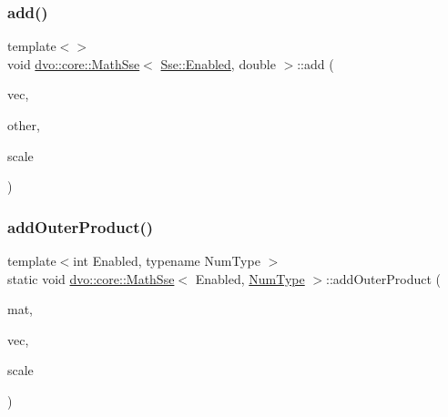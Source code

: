 \mbox{\label{classdvo_1_1core_1_1_math_sse_a569d441b55c932cf1220a93ef5f155f3}} 
\subsubsection{\texorpdfstring{add()}{add()}\hspace{0.1cm}{\footnotesize\ttfamily [5/5]}}
{\footnotesize\ttfamily template$<$$>$ \\
void \mbox{\hyperlink{classdvo_1_1core_1_1_math_sse}{dvo\+::core\+::\+Math\+Sse}}$<$ \mbox{\hyperlink{structdvo_1_1core_1_1_sse_a4fd9b55a1ec035f837cc78f33d45a9adadefbacd4d80d2e8ba64c1583a4fda95a}{Sse\+::\+Enabled}}, double $>$\+::add (\begin{DoxyParamCaption}\item[{Eigen\+::\+Matrix$<$ double, 6, 1 $>$ \&}]{vec,  }\item[{const Eigen\+::\+Matrix$<$ double, 6, 1 $>$ \&}]{other,  }\item[{const double \&}]{scale }\end{DoxyParamCaption})}

\mbox{\label{classdvo_1_1core_1_1_math_sse_af3aa0fc81f7709b6f12e3d771741e469}} 
\subsubsection{\texorpdfstring{add\+Outer\+Product()}{addOuterProduct()}\hspace{0.1cm}{\footnotesize\ttfamily [1/5]}}
{\footnotesize\ttfamily template$<$int Enabled, typename Num\+Type $>$ \\
static void \mbox{\hyperlink{classdvo_1_1core_1_1_math_sse}{dvo\+::core\+::\+Math\+Sse}}$<$ Enabled, \mbox{\hyperlink{namespacedvo_1_1core_ab9c199d221775a923e2549ad7e15c323}{Num\+Type}} $>$\+::add\+Outer\+Product (\begin{DoxyParamCaption}\item[{Eigen\+::\+Matrix$<$ \mbox{\hyperlink{namespacedvo_1_1core_ab9c199d221775a923e2549ad7e15c323}{Num\+Type}}, 6, 6 $>$ \&}]{mat,  }\item[{const Eigen\+::\+Matrix$<$ \mbox{\hyperlink{namespacedvo_1_1core_ab9c199d221775a923e2549ad7e15c323}{Num\+Type}}, 6, 1 $>$ \&}]{vec,  }\item[{const \mbox{\hyperlink{namespacedvo_1_1core_ab9c199d221775a923e2549ad7e15c323}{Num\+Type}} \&}]{scale }\end{DoxyParamCaption})\hspace{0.3cm}{\ttfamily [static]}}

